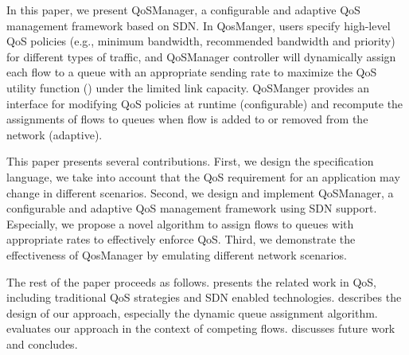 In this paper, we present QoSManager, a configurable and adaptive QoS management framework based on SDN. In
QosManger, users specify high-level QoS policies (e.g., minimum bandwidth, recommended bandwidth and priority)
for different types of traffic, and QoSManager controller will dynamically assign each flow to a queue with an
appropriate sending rate to maximize the QoS utility function () under the limited link capacity.
QoSManger provides an interface for modifying QoS policies at runtime (configurable) and recompute the assignments
of flows to queues when flow is added to or removed from the network (adaptive).

This paper presents several contributions. First, we design the specification language,  we take into account
that the QoS requirement for an application may change in different scenarios. Second, we design and implement
QoSManager, a configurable and adaptive QoS management framework using SDN support. Especially, we propose a novel
algorithm to assign flows to queues with appropriate rates to effectively enforce QoS. Third, we demonstrate the
effectiveness of QosManager by emulating different network scenarios.

The rest of the paper proceeds as follows. 
 presents the related work in QoS, including traditional QoS strategies and SDN enabled technologies.
 describes the design of our approach, especially the dynamic queue assignment algorithm.
 evaluates our approach in the context of competing flows.  discusses future work
and concludes.
